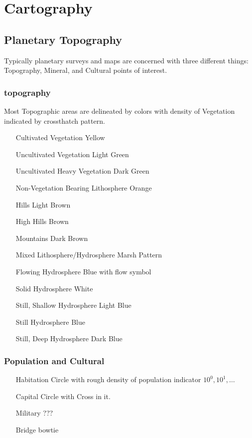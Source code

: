 \chapter{Cartography}

\section{Planetary Topography}

Typically planetary surveys and maps are concerned with three 
different things: Topography, Mineral, and Cultural points of interest.

\subsection{topography}
Most Topographic areas are delineated by colors with density of Vegetation 
indicated by crossthatch pattern.

\begin{itemize}
	\item[Cultivated Vegetation]
	Yellow
	\item[Uncultivated Vegetation]
	Light Green
	\item[Uncultivated Heavy Vegetation]
	Dark Green
	\item[Non-Vegetation Bearing Lithosphere]
	Orange
	\item[Hills]
	Light Brown
	\item[High Hills]
	Brown
	\item[Mountains]
	Dark Brown
	\item[Mixed Lithosphere/Hydrosphere]	
	Marsh Pattern
	\item[Flowing Hydrosphere]
	Blue with flow symbol
	\item[Solid Hydrosphere]
	White
	\item[Still, Shallow Hydrosphere]
	Light Blue
	\item[Still Hydrosphere]	
	Blue
	\item[Still, Deep Hydrosphere]
	Dark Blue
\end{itemize}

\subsection{Population and Cultural}

\begin{itemize}
	\item[Habitation]
	Circle with rough density of population indicator \( 10^0, 10^1, \dots \)
	\item[Capital]
	Circle with Cross in it.
	\item[Military]	
	???
	\item[Bridge]
	bowtie
\end{itemize}

